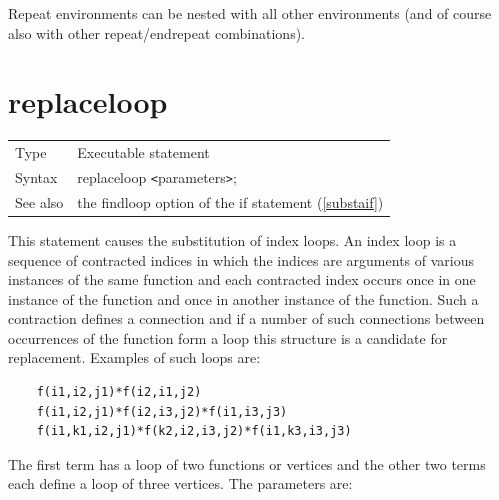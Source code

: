 \noindent Repeat environments can be nested with all other 
environments (and of course also with other repeat/endrepeat combinations). 
\vspace{10mm}


\section{replaceloop}
\label{substareplaceloop}

\noindent \begin{tabular}{ll}
Type & Executable statement\\
Syntax & replaceloop {\tt<}parameters{\tt>};
\\ See also & the findloop option of the if statement (\ref{substaif})
\end{tabular}\vspace{4mm}

\noindent This statement causes the substitution of 
index loops. An index loop is a 
sequence of contracted indices in which the indices are arguments of 
various instances of the same function and each contracted index occurs once in one instance of the 
function and once in another instance of the function. Such a contraction 
defines a connection and if a number of such connections between 
occurrences of the function form a loop this structure is a candidate for 
replacement. Examples of such loops are:
\begin{verbatim}
    f(i1,i2,j1)*f(i2,i1,j2)
    f(i1,i2,j1)*f(i2,i3,j2)*f(i1,i3,j3)
    f(i1,k1,i2,j1)*f(k2,i2,i3,j2)*f(i1,k3,i3,j3)
\end{verbatim}
The first term has a loop of two functions or vertices and 
the other two terms each define a loop of three vertices. The parameters 
are:




